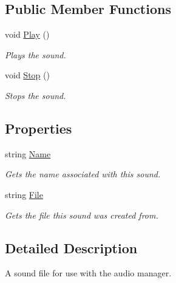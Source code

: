 \subsection*{Public Member Functions}
\begin{DoxyCompactItemize}
\item 
void \hyperlink{interface_tri_devs_1_1_tri_engine2_d_1_1_audio_1_1_i_sound_a10ce9e86e0795a89000719bc8078bfd4}{Play} ()
\begin{DoxyCompactList}\small\item\em Plays the sound. \end{DoxyCompactList}\item 
void \hyperlink{interface_tri_devs_1_1_tri_engine2_d_1_1_audio_1_1_i_sound_a9ad9c109f807052de7883d2b04995344}{Stop} ()
\begin{DoxyCompactList}\small\item\em Stops the sound. \end{DoxyCompactList}\end{DoxyCompactItemize}
\subsection*{Properties}
\begin{DoxyCompactItemize}
\item 
string \hyperlink{interface_tri_devs_1_1_tri_engine2_d_1_1_audio_1_1_i_sound_a2307573aedd92969cf3d051b395c5bc0}{Name}
\begin{DoxyCompactList}\small\item\em Gets the name associated with this sound. \end{DoxyCompactList}\item 
string \hyperlink{interface_tri_devs_1_1_tri_engine2_d_1_1_audio_1_1_i_sound_af308fcad8f9f11a39af7a3d253039cae}{File}
\begin{DoxyCompactList}\small\item\em Gets the file this sound was created from. \end{DoxyCompactList}\end{DoxyCompactItemize}


\subsection{Detailed Description}
A sound file for use with the audio manager. 



